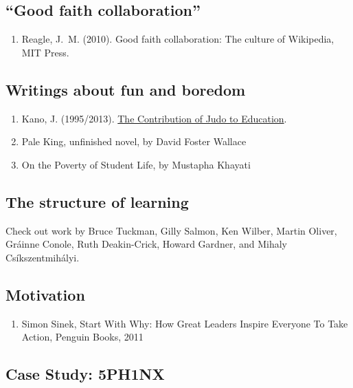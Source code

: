 \subsection{``Good faith
collaboration''}\label{rec:good-faith-collaboration}

\begin{enumerate}
\def\labelenumi{\arabic{enumi}.}
\itemsep1pt\parskip0pt
\item
  Reagle, J.~M. (2010). Good faith collaboration: The culture of
  Wikipedia, MIT Press.
\end{enumerate}

\subsection{Writings about fun and
boredom}\label{rec:writings-about-fun-and-boredom}

\begin{enumerate}
\def\labelenumi{\arabic{enumi}.}
\item
  Kano, J. (1995/2013). \href{http://judoinfo.com/kano.htm}{The
  Contribution of Judo to Education}.
\item
  Pale King, unfinished novel, by David Foster Wallace
\item
  On the Poverty of Student Life, by Mustapha Khayati
\end{enumerate}

\subsection{The structure of learning}\label{rec:the-structure-of-learning}

Check out work by Bruce Tuckman, Gilly Salmon, Ken Wilber, Martin
Oliver, Gráinne Conole, Ruth Deakin-Crick, Howard Gardner, and Mihaly
Csíkszentmihályi.

\subsection{Motivation}\label{rec:motivation}

\begin{enumerate}
\def\labelenumi{\arabic{enumi}.}
\itemsep1pt\parskip0pt
\item
  Simon Sinek, Start With Why: How Great Leaders Inspire Everyone To
  Take Action, Penguin Books, 2011
\end{enumerate}

\subsection{Case Study: 5PH1NX}\label{rec:case-study-5ph1nx}

